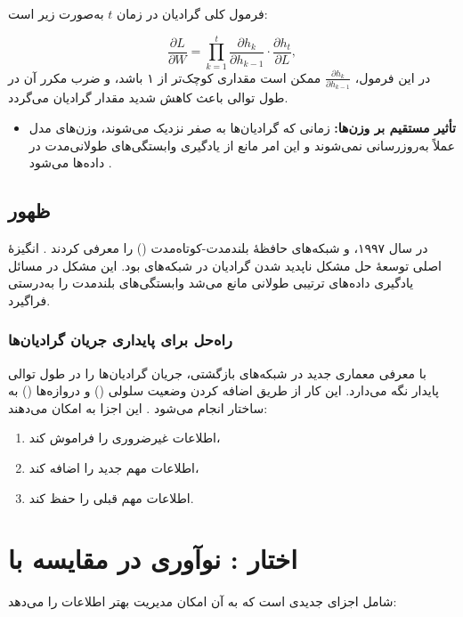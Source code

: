 فرمول کلی گرادیان در زمان \( t \) به‌صورت زیر است:

\[
\frac{\partial L}{\partial W} = \prod_{k=1}^{t} \frac{\partial h_k}{\partial h_{k-1}} \cdot \frac{\partial h_t}{\partial L},
\]
در این فرمول، \( \frac{\partial h_k}{\partial h_{k-1}} \) ممکن است مقداری کوچک‌تر از ۱ باشد، و ضرب مکرر آن در طول توالی باعث کاهش شدید مقدار گرادیان می‌گردد.

\begin{itemize}
	\item \textbf{تأثیر مستقیم بر وزن‌ها:}
	زمانی که گرادیان‌ها به صفر نزدیک می‌شوند، وزن‌های مدل عملاً به‌روزرسانی نمی‌شوند و این امر مانع از یادگیری وابستگی‌های طولانی‌مدت در داده‌ها می‌شود
	\cite{goodfellow2016deep}.
\end{itemize}

\subsection{ظهور }
در سال ۱۹۹۷،  و  شبکه‌های حافظهٔ بلندمدت-کوتاه‌مدت () را معرفی کردند
\cite{hochreiter1997long}.
انگیزهٔ اصلی توسعهٔ  حل مشکل ناپدید شدن گرادیان در شبکه‌های  بود. این مشکل در مسائل یادگیری داده‌های ترتیبی طولانی مانع می‌شد  وابستگی‌های بلندمدت را به‌درستی فراگیرد.

\subsubsection{راه‌حل  برای پایداری جریان گرادیان‌ها}
 با معرفی معماری جدید در شبکه‌های بازگشتی، جریان گرادیان‌ها را در طول توالی پایدار نگه می‌دارد. این کار از طریق اضافه کردن وضعیت سلولی () و دروازه‌ها () به ساختار  انجام می‌شود
\cite{gers1999learning}.
این اجزا به  امکان می‌دهند:

\begin{enumerate}
	\item اطلاعات غیرضروری را فراموش کند،
	\item اطلاعات مهم جدید را اضافه کند،
	\item اطلاعات مهم قبلی را حفظ کند.
\end{enumerate}

\section{اختار : نوآوری در مقایسه با }
 شامل اجزای جدیدی است که به آن امکان مدیریت بهتر اطلاعات را می‌دهد:


